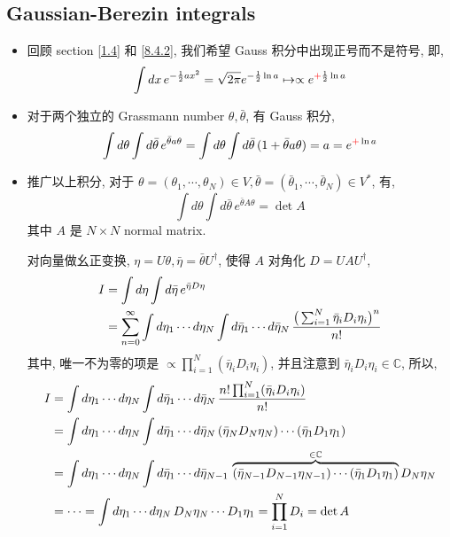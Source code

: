 \subsection{Gaussian-Berezin integrals}
\begin{itemize}
	\item 回顾 section \ref{1.4} 和 \eqref{8.4.2}, 我们希望 Gauss 积分中出现正号而不是符号, 即,
	\begin{equation}
		\int dx \, e^{- \frac{1}{2} a x^2} = \sqrt{2 \pi} e^{- \frac{1}{2} \ln a} \mapsto \propto e^{\mathcolor{red}{+} \frac{1}{2} \ln a}
	\end{equation}
	
	\item 对于两个独立的 Grassmann number $\theta, \bar{\theta}$, 有 Gauss 积分,
	\begin{equation}
		\int d\theta \int d\bar{\theta} \, e^{\bar{\theta} a \theta} = \int d\theta \int d\bar{\theta} \, (1 + \bar{\theta} a \theta) = a = e^{\mathcolor{red}{+} \ln a}
	\end{equation}
	
	\item 推广以上积分, 对于 $\theta = (\theta_1, \cdots, \theta_N) \in V, \bar{\theta} = (\bar{\theta}_1, \cdots, \bar{\theta}_N) \in V^*$, 有,
	\begin{equation}
		\int d\theta \int d\bar{\theta} \, e^{\bar{\theta} A \theta} = \det A
	\end{equation}
	其中 $A$ 是 $N \times N$ normal matrix.
	
	\begin{tcolorbox}[title=calculation:]
		对向量做幺正变换, $\eta = U \theta, \bar{\eta} = \bar{\theta} U^\dag$, 使得 $A$ 对角化 $D = U A U^\dag$,
		\begin{align}
			I &= \int d\eta \int d\bar{\eta} \, e^{\bar{\eta} D \eta} \notag \\
			&= \sum_{n = 0}^\infty \int d\eta_1 \cdots d\eta_N \int d\bar{\eta}_1 \cdots d\bar{\eta}_N \, \frac{\big( \sum_{i = 1}^N \bar{\eta}_i D_i \eta_i \big)^n}{n!}
		\end{align}
		其中, 唯一不为零的项是 $\propto \prod_{i = 1}^N (\bar{\eta}_i D_i \eta_i)$, 并且注意到 $\bar{\eta}_i D_i \eta_i \in \mathbb{C}$, 所以,
		\begin{align}
			I &= \int d\eta_1 \cdots d\eta_N \int d\bar{\eta}_1 \cdots d\bar{\eta}_N \, \frac{n! \prod_{i = 1}^N (\bar{\eta}_i D_i \eta_i)}{n!} \notag \\
			&= \int d\eta_1 \cdots d\eta_N \int d\bar{\eta}_1 \cdots d\bar{\eta}_N \, (\bar{\eta}_N D_N \eta_N) \cdots (\bar{\eta}_1 D_1 \eta_1) \notag \\
			&= \int d\eta_1 \cdots d\eta_N \int d\bar{\eta}_1 \cdots d\bar{\eta}_{N - 1} \, \overbrace{(\bar{\eta}_{N - 1} D_{N - 1} \eta_{N - 1}) \cdots (\bar{\eta}_1 D_1 \eta_1)}^{\in \mathbb{C}} D_N \eta_N \notag \\
			&= \cdots = \int d\eta_1 \cdots d\eta_N \, D_N \eta_N \cdots D_1 \eta_1 = \prod_{i = 1}^N D_i = \det A
		\end{align}
	\end{tcolorbox}
	

\end{itemize}
